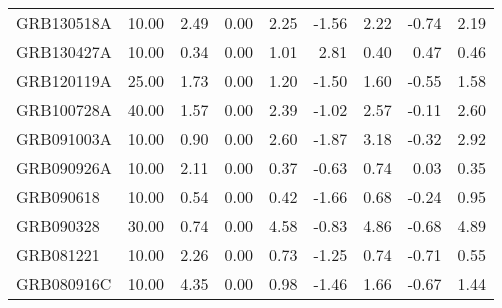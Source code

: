 \begin{tabular}{lrrrrrrrr}
GRB130518A & 10.00 & 2.49 & 0.00 & 2.25 & -1.56 & 2.22 & -0.74 & 2.19 \\
GRB130427A & 10.00 & 0.34 & 0.00 & 1.01 & 2.81 & 0.40 & 0.47 & 0.46 \\
GRB120119A & 25.00 & 1.73 & 0.00 & 1.20 & -1.50 & 1.60 & -0.55 & 1.58 \\
GRB100728A & 40.00 & 1.57 & 0.00 & 2.39 & -1.02 & 2.57 & -0.11 & 2.60 \\
GRB091003A & 10.00 & 0.90 & 0.00 & 2.60 & -1.87 & 3.18 & -0.32 & 2.92 \\
GRB090926A & 10.00 & 2.11 & 0.00 & 0.37 & -0.63 & 0.74 & 0.03 & 0.35 \\
GRB090618 & 10.00 & 0.54 & 0.00 & 0.42 & -1.66 & 0.68 & -0.24 & 0.95 \\
GRB090328 & 30.00 & 0.74 & 0.00 & 4.58 & -0.83 & 4.86 & -0.68 & 4.89 \\
GRB081221 & 10.00 & 2.26 & 0.00 & 0.73 & -1.25 & 0.74 & -0.71 & 0.55 \\
GRB080916C & 10.00 & 4.35 & 0.00 & 0.98 & -1.46 & 1.66 & -0.67 & 1.44 \\
\bottomrule
\end{tabular}
